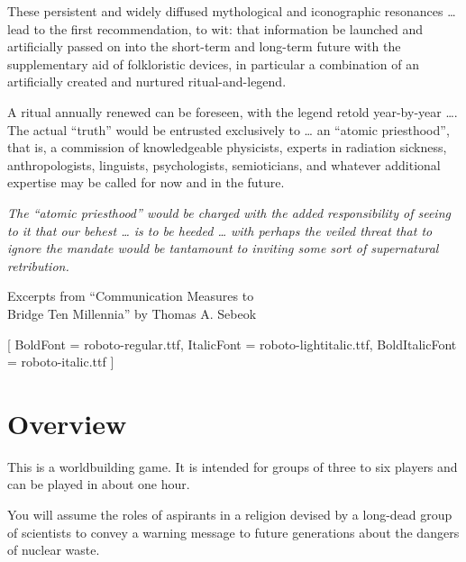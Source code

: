 \documentclass[a6paper, 11pt, parskip=half, DIV=15]{scrartcl}
\begin{document}
These persistent and widely diffused mythological and iconographic resonances
\ldots{} %
lead to the first recommendation, to wit: that information be launched and
artificially passed on into the short-term and long-term future with the supplementary aid of folkloristic devices, in particular a combination of an
artificially created and nurtured ritual-and-legend.

\bigskip

A ritual annually renewed can be foreseen, with the legend retold year-by-year \ldots{}. %
The actual ``truth'' would be entrusted exclusively to \ldots{} %
an ``atomic priesthood'', that is, a commission of knowledgeable physicists,
experts in radiation sickness, anthropologists, linguists, psychologists,
semioticians, and whatever additional expertise may be called for now and in
the future.
\normalfont

\bigskip

\itshape The ``atomic priesthood'' would be charged with the added responsibility of seeing
to it that our behest \ldots{} %
is to be heeded \ldots{} %
with perhaps the veiled threat that to ignore the mandate would be tantamount to
inviting some sort of supernatural retribution.
\normalfont

\bigskip

\textemdash{} Excerpts from ``Communication Measures to\\
\phantom{\textemdash{}} Bridge Ten Millennia'' by Thomas A. Sebeok

\setmainfont{Roboto-Light}[
	BoldFont = roboto-regular.ttf,
	ItalicFont = roboto-lightitalic.ttf,
	BoldItalicFont = roboto-italic.ttf
]
\normalsize

\newpage
\enlargethispage{1.75\baselineskip}

\section*{Overview}
This is a worldbuilding game. It is intended for groups of three to six players and can be played in about one hour.

You will assume the roles of aspirants in a religion devised by a long-dead group of scientists to convey a warning message to future generations about the dangers of nuclear waste.
\end{document}

